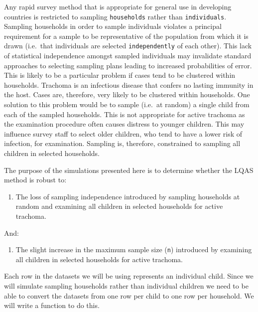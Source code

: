 \documentclass[12pt,a4paper]{book}
\providecommand{\tightlist}{%
  \setlength{\itemsep}{0pt}\setlength{\parskip}{0pt}}
\theoremstyle{definition}
\theoremstyle{definition}
\theoremstyle{definition}
\theoremstyle{remark}
\begin{document}
Any rapid survey method that is appropriate for general use in
developing countries is restricted to sampling \texttt{households}
rather than \texttt{individuals}. Sampling households in order to sample
individuals violates a principal requirement for a sample to be
representative of the population from which it is drawn (i.e.~that
individuals are selected \texttt{independently} of each other). This
lack of statistical independence amongst sampled individuals may
invalidate standard approaches to selecting sampling plans leading to
increased probabilities of error. This is likely to be a particular
problem if cases tend to be clustered within households. Trachoma is an
infectious disease that confers no lasting immunity in the host. Cases
are, therefore, very likely to be clustered within households. One
solution to this problem would be to sample (i.e.~at random) a single
child from each of the sampled households. This is not appropriate for
active trachoma as the examination procedure often causes distress to
younger children. This may influence survey staff to select older
children, who tend to have a lower risk of infection, for examination.
Sampling is, therefore, constrained to sampling all children in selected
households.

The purpose of the simulations presented here is to determine whether
the LQAS method is robust to:

\begin{enumerate}
\def\labelenumi{\arabic{enumi}.}
\tightlist
\item
  The loss of sampling independence introduced by sampling households at
  random and examining all children in selected households for active
  trachoma.
\end{enumerate}

And:

\begin{enumerate}
\def\labelenumi{\arabic{enumi}.}
\setcounter{enumi}{1}
\tightlist
\item
  The slight increase in the maximum sample size (\texttt{n}) introduced
  by examining all children in selected households for active trachoma.
\end{enumerate}

Each row in the datasets we will be using represents an individual
child. Since we will simulate sampling households rather than individual
children we need to be able to convert the datasets from one row per
child to one row per household. We will write a function to do this.
\end{document}
